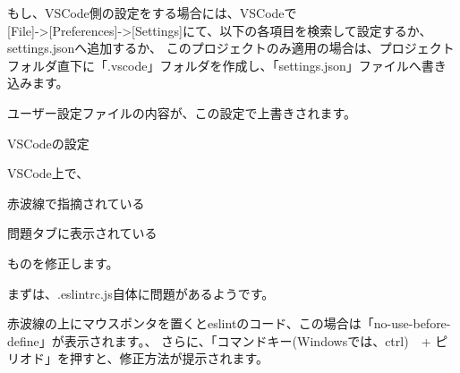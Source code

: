 \vspace*{\baselineskip}

もし、VSCode側の設定をする場合には、VSCodeで\\[0pt]
[File]{-}\textgreater{}[Preferences]{-}\textgreater{}[Settings]にて、以下の各項目を検索して設定するか、settings.jsonへ追加するか、
このプロジェクトのみ適用の場合は、プロジェクトフォルダ直下に「.vscode」フォルダを作成し、「settings.json」ファイルへ書き込みます。

ユーザー設定ファイルの内容が、この設定で上書きされます。

\def\startercodeblockfontsize{}
\begin{starterprogram}[]{VSCodeの設定}\end{starterprogram}

VSCode上で、\\[0pt]

\begin{starteritemize}
\item 赤波線で指摘されている
\item 問題タブに表示されている
\end{starteritemize}

\vspace*{\baselineskip}

ものを修正します。

\vspace*{\baselineskip}

まずは、.eslintrc.js自体に問題があるようです。

赤波線の上にマウスポンタを置くとeslintのコード、この場合は「no{-}use{-}before{-}define」が表示されます。、
さらに、「コマンドキー(Windowsでは、ctrl)　+ ピリオド」を押すと、修正方法が提示されます。


